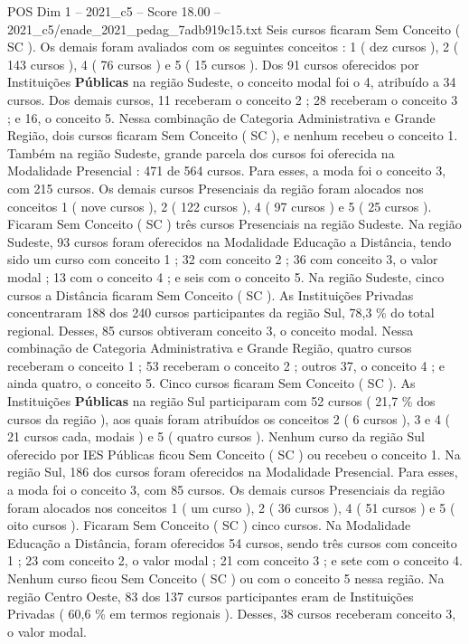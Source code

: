 \begin{textsample}{POS Dim 1 – 2021\_c5 – Score 18.00 – 2021\_c5/enade\_2021\_pedag\_7adb919c15.txt}
Seis cursos ficaram Sem Conceito ( SC ).
Os demais foram avaliados com os seguintes conceitos : 1 ( dez cursos ), 2 ( 143 cursos ), 4 ( 76 cursos ) e 5 ( 15 cursos ).
Dos 91 cursos oferecidos por Instituições \textbf{Públicas} na região Sudeste, o conceito modal foi o 4, atribuído a 34 cursos.
Dos demais cursos, 11 receberam o conceito 2 ; 28 receberam o conceito 3 ; e 16, o conceito 5.
Nessa combinação de Categoria Administrativa e Grande Região, dois cursos ficaram Sem Conceito ( SC ), e nenhum recebeu o conceito 1.
Também na região Sudeste, grande parcela dos cursos foi oferecida na Modalidade Presencial : 471 de 564 cursos.
Para esses, a moda foi o conceito 3, com 215 cursos.
Os demais cursos Presenciais da região foram alocados nos conceitos 1 ( nove cursos ), 2 ( 122 cursos ), 4 ( 97 cursos ) e 5 ( 25 cursos ).
Ficaram Sem Conceito ( SC ) três cursos Presenciais na região Sudeste.
Na região Sudeste, 93 cursos foram oferecidos na Modalidade Educação a Distância, tendo sido um curso com conceito 1 ; 32 com conceito 2 ; 36 com conceito 3, o valor modal ; 13 com o conceito 4 ; e seis com o conceito 5.
Na região Sudeste, cinco cursos a Distância ficaram Sem Conceito ( SC ).
As Instituições Privadas concentraram 188 dos 240 cursos participantes da região Sul, 78,3 \% do total regional.
Desses, 85 cursos obtiveram conceito 3, o conceito modal.
Nessa combinação de Categoria Administrativa e Grande Região, quatro cursos receberam o conceito 1 ; 53 receberam o conceito 2 ; outros 37, o conceito 4 ; e ainda quatro, o conceito 5.
Cinco cursos ficaram Sem Conceito ( SC ).
As Instituições \textbf{Públicas} na região Sul participaram com 52 cursos ( 21,7 \% dos cursos da região ), aos quais foram atribuídos os conceitos 2 ( 6 cursos ), 3 e 4 ( 21 cursos cada, modais ) e 5 ( quatro cursos ).
Nenhum curso da região Sul oferecido por IES Públicas ficou Sem Conceito ( SC ) ou recebeu o conceito 1.
Na região Sul, 186 dos cursos foram oferecidos na Modalidade Presencial.
Para esses, a moda foi o conceito 3, com 85 cursos.
Os demais cursos Presenciais da região foram alocados nos conceitos 1 ( um curso ), 2 ( 36 cursos ), 4 ( 51 cursos ) e 5 ( oito cursos ).
Ficaram Sem Conceito ( SC ) cinco cursos.
Na Modalidade Educação a Distância, foram oferecidos 54 cursos, sendo três cursos com conceito 1 ; 23 com conceito 2, o valor modal ; 21 com conceito 3 ; e sete com o conceito 4.
Nenhum curso ficou Sem Conceito ( SC ) ou com o conceito 5 nessa região.
Na região Centro Oeste, 83 dos 137 cursos participantes eram de Instituições Privadas ( 60,6 \% em termos regionais ).
Desses, 38 cursos receberam conceito 3, o valor modal.

\end{textsample}

